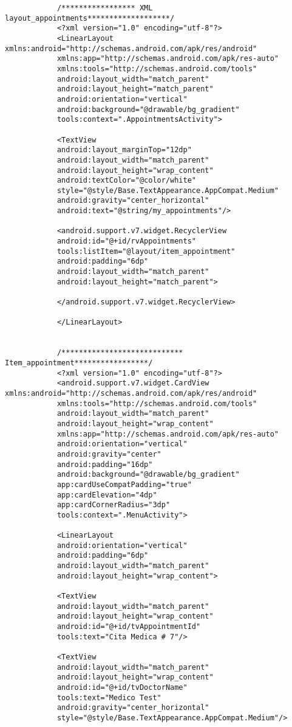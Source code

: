 \documentclass[a4paper]{article}
\begin{document}
		\begin{lstlisting}
			/***************** XML layout_appointments*******************/
			<?xml version="1.0" encoding="utf-8"?>
			<LinearLayout xmlns:android="http://schemas.android.com/apk/res/android"
			xmlns:app="http://schemas.android.com/apk/res-auto"
			xmlns:tools="http://schemas.android.com/tools"
			android:layout_width="match_parent"
			android:layout_height="match_parent"
			android:orientation="vertical"
			android:background="@drawable/bg_gradient"
			tools:context=".AppointmentsActivity">
			
			<TextView
			android:layout_marginTop="12dp"
			android:layout_width="match_parent"
			android:layout_height="wrap_content"
			android:textColor="@color/white"
			style="@style/Base.TextAppearance.AppCompat.Medium"
			android:gravity="center_horizontal"
			android:text="@string/my_appointments"/>
			
			<android.support.v7.widget.RecyclerView
			android:id="@+id/rvAppointments"
			tools:listItem="@layout/item_appointment"
			android:padding="6dp"
			android:layout_width="match_parent"
			android:layout_height="match_parent">
			
			</android.support.v7.widget.RecyclerView>
			
			</LinearLayout>
			
			
			/**************************** Item_appointment*****************/
			<?xml version="1.0" encoding="utf-8"?>
			<android.support.v7.widget.CardView xmlns:android="http://schemas.android.com/apk/res/android"
			xmlns:tools="http://schemas.android.com/tools"
			android:layout_width="match_parent"
			android:layout_height="wrap_content"
			xmlns:app="http://schemas.android.com/apk/res-auto"
			android:orientation="vertical"
			android:gravity="center"
			android:padding="16dp"
			android:background="@drawable/bg_gradient"
			app:cardUseCompatPadding="true"
			app:cardElevation="4dp"
			app:cardCornerRadius="3dp"
			tools:context=".MenuActivity">
			
			<LinearLayout
			android:orientation="vertical"
			android:padding="6dp"
			android:layout_width="match_parent"
			android:layout_height="wrap_content">
			
			<TextView
			android:layout_width="match_parent"
			android:layout_height="wrap_content"
			android:id="@+id/tvAppointmentId"
			tools:text="Cita Medica # 7"/>
			
			<TextView
			android:layout_width="match_parent"
			android:layout_height="wrap_content"
			android:id="@+id/tvDoctorName"
			tools:text="Medico Test"
			android:gravity="center_horizontal"
			style="@style/Base.TextAppearance.AppCompat.Medium"/>
			

\end{lstlisting}
\end{document}
